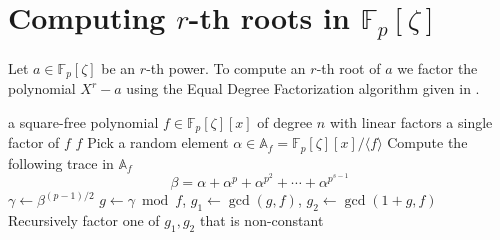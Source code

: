 \documentclass[12pt]{article}
\theoremstyle{plain}
\theoremstyle{definition}
\def\F{\mathbb{F}}
\newcounter{algorithm}
\begin{document}

\section{Computing $r$-th roots in $\F_p[\zeta]$}
\label{subsection:rth-root-fpz}

Let $a \in \F_p[\zeta]$ be an $r$-th power. To compute an $r$-th root of $a$ we factor the polynomial $X^r - a$ using the Equal Degree Factorization algorithm given in \cite{kaltofen1997fast}.

\begin{algorithm}
\label{algorithm:edf}
	\begin{algorithmic}[1]
		\REQUIRE a square-free polynomial $f \in \F_p[\zeta][x]$ of degree $n$ with linear factors
		\ENSURE a single factor of $f$
			\RETURN $f$
		\ENDIF
		\STATE Pick a random element $\alpha \in \mathbb{A}_f = \F_p[\zeta][x]/\langle f \rangle$
		\STATE\label{step:edf-trace} Compute the following trace in $\mathbb{A}_f$
			\[ \beta = \alpha + \alpha^p + \alpha^{p^2} + \cdots + \alpha^{p^{s - 1}} \]
		\STATE $\gamma \leftarrow \beta^{(p - 1) / 2}$
		\STATE $g \leftarrow \gamma \bmod f$, $g_1 \leftarrow \gcd(g, f)$, $g_2 \leftarrow \gcd(1 + g, f)$
		\STATE Recursively factor one of $g_1, g_2$ that is non-constant
	\end{algorithmic}
\end{algorithm}
\end{document}
